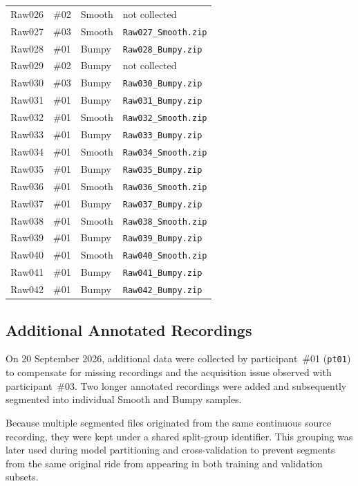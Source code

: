 \begin{table}[htbp]
\begin{tabular}{llll}
Raw026 & \#02 & Smooth & not collected \\
Raw027 & \#03 & Smooth & \texttt{Raw027\_Smooth.zip} \\
Raw028 & \#01 & Bumpy  & \texttt{Raw028\_Bumpy.zip} \\
Raw029 & \#02 & Bumpy  & not collected \\
Raw030 & \#03 & Bumpy  & \texttt{Raw030\_Bumpy.zip} \\
Raw031 & \#01 & Bumpy  & \texttt{Raw031\_Bumpy.zip} \\
Raw032 & \#01 & Smooth & \texttt{Raw032\_Smooth.zip} \\
Raw033 & \#01 & Bumpy  & \texttt{Raw033\_Bumpy.zip} \\
Raw034 & \#01 & Smooth & \texttt{Raw034\_Smooth.zip} \\
Raw035 & \#01 & Bumpy  & \texttt{Raw035\_Bumpy.zip} \\
Raw036 & \#01 & Smooth & \texttt{Raw036\_Smooth.zip} \\
Raw037 & \#01 & Bumpy  & \texttt{Raw037\_Bumpy.zip} \\
Raw038 & \#01 & Smooth & \texttt{Raw038\_Smooth.zip} \\
Raw039 & \#01 & Bumpy  & \texttt{Raw039\_Bumpy.zip} \\
Raw040 & \#01 & Smooth & \texttt{Raw040\_Smooth.zip} \\
Raw041 & \#01 & Bumpy  & \texttt{Raw041\_Bumpy.zip} \\
Raw042 & \#01 & Bumpy  & \texttt{Raw042\_Bumpy.zip} \\
\bottomrule
\end{tabular}
\end{table}

\subsection{Additional Annotated Recordings}

On 20 September 2026, additional data were collected by participant~\#01
(\texttt{pt01}) to compensate for missing recordings and the acquisition issue
observed with participant~\#03. Two longer annotated recordings were added and
subsequently segmented into individual Smooth and Bumpy samples.

Because multiple segmented files originated from the same continuous source
recording, they were kept under a shared split-group identifier. This grouping
was later used during model partitioning and cross-validation to prevent
segments from the same original ride from appearing in both training and
validation subsets.

